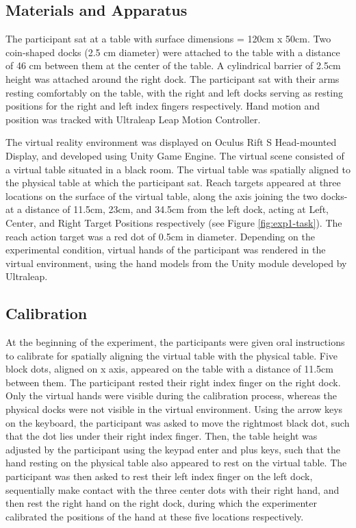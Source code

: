 \subsection{Materials and Apparatus}
The participant sat at a table with surface dimensions = 120cm x 50cm. Two coin-shaped docks (2.5 cm diameter) were attached to the table with a distance of 46 cm between them at the center of the table. A cylindrical barrier of 2.5cm height was attached around the right dock. The participant sat with their arms resting comfortably on the table, with the right and left docks serving as resting positions for the right and left index fingers respectively. Hand motion and position was tracked with Ultraleap Leap Motion Controller. 

The virtual reality environment was displayed on Oculus Rift S Head-mounted Display, and developed using Unity Game Engine. The virtual scene consisted of a virtual table situated in a black room. The virtual table was spatially aligned to the physical table at which the participant sat. Reach targets appeared at three locations on the surface of the virtual table, along the axis joining the two docks- at a distance of 11.5cm, 23cm, and 34.5cm from the left dock, acting at Left, Center, and Right Target Positions respectively (see Figure \ref{fig:exp1-task}). The reach action target was a red dot of 0.5cm in diameter.  Depending on the experimental condition, virtual hands of the participant was rendered in the virtual environment, using the hand models from the Unity module developed by Ultraleap.



\subsection{Calibration} 

At the beginning of the experiment, the participants were given oral instructions to calibrate for spatially aligning the virtual table with the physical table. Five block dots, aligned on x axis, appeared on the table with a distance of 11.5cm between them. The participant rested their right index finger on the right dock. Only the virtual hands were visible during the calibration process, whereas the physical docks were not visible in the virtual environment. Using the arrow keys on the keyboard, the participant was asked to move the rightmost black dot, such that the dot lies under their right index finger. Then, the table height was adjusted by the participant using the keypad enter and plus keys, such that the hand resting on the physical table also appeared to rest on the virtual table. The participant was then asked to rest their left index finger on the left dock, sequentially make contact with the three center dots with their right hand, and then rest the right hand on the right dock, during which the experimenter calibrated the positions of the hand at these five locations respectively.


